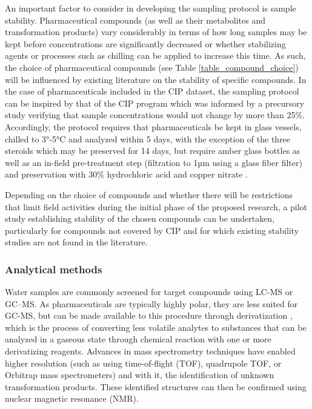 \documentclass{article}
\begin{document}
An important factor to consider in developing the sampling protocol is sample stability. Pharmaceutical compounds (as well as their metabolites and transformation products) vary considerably in terms of how long samples may be kept before concentrations are significantly decreased \citep{Caban2015AnalyticalProspects} or whether stabilizing agents or processes such as chilling can be applied to increase this time. As such, the choice of pharmaceutical compounds (see Table \ref{table_compound_choice}) will be influenced by existing literature on the stability of specific compounds. In the case of pharmaceuticals included in the CIP dataset, the sampling protocol can be inspired by that of the CIP program which was informed by a precursory study \citep{Gardner2012SampleWastewater} verifying that sample concentrations would not change by more than 25\%. Accordingly, the protocol requires that pharmaceuticals be kept in glass vessels, chilled to 3°-5°C and analyzed within 5 days, with the exception of the three steroids which may be preserved for 14 days, but require amber glass bottles as well as an in-field pre-treatment step (filtration to 1µm using a glass fiber filter) and preservation with 30\% hydrochloric acid and copper nitrate \citep{UKWIR2015DraftGuidance}.

Depending on the choice of compounds and whether there will be restrictions that limit field activities during the initial phase of the proposed research, a pilot study establishing stability of the chosen compounds can be undertaken, particularly for compounds not covered by CIP and for which existing stability studies are not found in the literature.

\subsubsection{Analytical methods}
Water samples are commonly screened for target compounds using LC-MS or GC–MS. As pharmaceuticals are typically highly polar, they are less suited for GC-MS, but can be made available to this procedure through derivatization \citep{Postigo2014TransformationTreatment}, which is the process of converting less volatile analytes to substances that can be analyzed in a gaseous state through chemical reaction with one or more derivatizing reagents. Advances in mass spectrometry techniques have enabled higher resolution (such as using time-of-flight (TOF), quadrupole TOF, or Orbitrap mass spectrometers) and with it, the identification of unknown transformation products. These identified structures can then be confirmed using nuclear magnetic resonance (NMR). 
\end{document}
